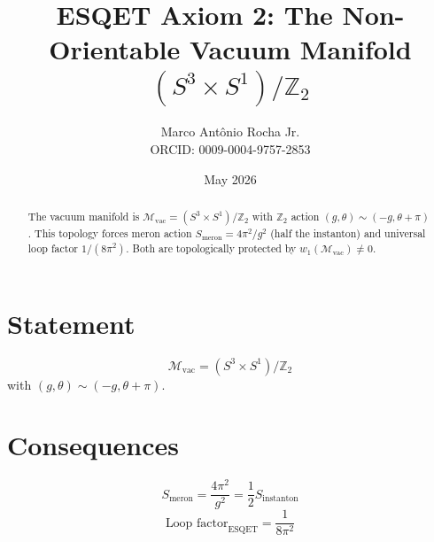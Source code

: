 \documentclass[11pt]{article}
\title{ESQET Axiom 2: The Non-Orientable Vacuum Manifold $(S^3 \times S^1)/\mathbb{Z}_2$}
\author{Marco Antônio Rocha Jr. \\ ORCID: 0009-0004-9757-2853}
\date{May 2026}
\begin{document}
\maketitle

\begin{abstract}
The vacuum manifold is $\mathcal{M}_{\text{vac}} = (S^3 \times S^1)/\mathbb{Z}_2$ with $\mathbb{Z}_2$ action $(g,\theta) \sim (-g, \theta+\pi)$. This topology forces meron action $S_{\text{meron}} = 4\pi^2/g^2$ (half the instanton) and universal loop factor $1/(8\pi^2)$. Both are topologically protected by $w_1(\mathcal{M}_{\text{vac}}) \neq 0$.
\end{abstract}

\section{Statement}
\begin{equation}
\boxed{\mathcal{M}_{\text{vac}} = (S^3 \times S^1) / \mathbb{Z}_2}
\end{equation}
with $(g,\theta) \sim (-g, \theta+\pi)$.

\section{Consequences}
\begin{equation}
S_{\text{meron}} = \frac{4\pi^2}{g^2} = \frac{1}{2} S_{\text{instanton}}
\end{equation}
\begin{equation}
\text{Loop factor}_{\text{ESQET}} = \frac{1}{8\pi^2}
\end{equation}
\end{document}
